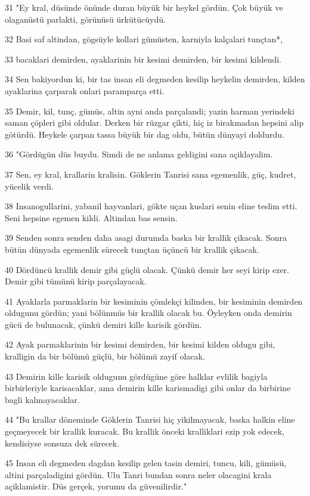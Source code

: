 \par 31 "Ey kral, düsünde önünde duran büyük bir heykel gördün. Çok büyük ve olaganüstü parlakti, görünüsü ürkütücüydü.
\par 32 Basi saf altindan, gögsüyle kollari gümüsten, karniyla kalçalari tunçtan*,
\par 33 bacaklari demirden, ayaklarinin bir kesimi demirden, bir kesimi kildendi.
\par 34 Sen bakiyordun ki, bir tas insan eli degmeden kesilip heykelin demirden, kilden ayaklarina çarparak onlari paramparça etti.
\par 35 Demir, kil, tunç, gümüs, altin ayni anda parçalandi; yazin harman yerindeki saman çöpleri gibi oldular. Derken bir rüzgar çikti, hiç iz birakmadan hepsini alip götürdü. Heykele çarpan tassa büyük bir dag oldu, bütün dünyayi doldurdu.
\par 36 "Gördügün düs buydu. Simdi de ne anlama geldigini sana açiklayalim.
\par 37 Sen, ey kral, krallarin kralisin. Göklerin Tanrisi sana egemenlik, güç, kudret, yücelik verdi.
\par 38 Insanogullarini, yabanil hayvanlari, gökte uçan kuslari senin eline teslim etti. Seni hepsine egemen kildi. Altindan bas sensin.
\par 39 Senden sonra senden daha asagi durumda baska bir krallik çikacak. Sonra bütün dünyada egemenlik sürecek tunçtan üçüncü bir krallik çikacak.
\par 40 Dördüncü krallik demir gibi güçlü olacak. Çünkü demir her seyi kirip ezer. Demir gibi tümünü kirip parçalayacak.
\par 41 Ayaklarla parmaklarin bir kesiminin çömlekçi kilinden, bir kesiminin demirden oldugunu gördün; yani bölünmüs bir krallik olacak bu. Öyleyken onda demirin gücü de bulunacak, çünkü demiri kille karisik gördün.
\par 42 Ayak parmaklarinin bir kesimi demirden, bir kesimi kilden oldugu gibi, kralligin da bir bölümü güçlü, bir bölümü zayif olacak.
\par 43 Demirin kille karisik oldugunu gördügüne göre halklar evlilik bagiyla birbirleriyle karisacaklar, ama demirin kille karismadigi gibi onlar da birbirine bagli kalmayacaklar.
\par 44 "Bu krallar döneminde Göklerin Tanrisi hiç yikilmayacak, baska halkin eline geçmeyecek bir krallik kuracak. Bu krallik önceki kralliklari ezip yok edecek, kendisiyse sonsuza dek sürecek.
\par 45 Insan eli degmeden dagdan kesilip gelen tasin demiri, tuncu, kili, gümüsü, altini parçaladigini gördün. Ulu Tanri bundan sonra neler olacagini krala açiklamistir. Düs gerçek, yorumu da güvenilirdir."
